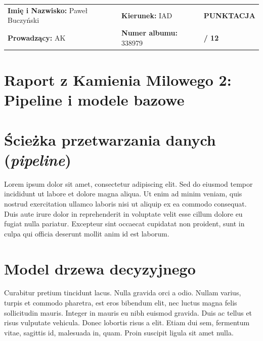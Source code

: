 \documentclass[a4paper,10pt]{article}
\begin{document}
\vspace{-1em}
\noindent
\renewcommand{\arraystretch}{1.3}
\begin{tabularx}{\textwidth}{|>{\hsize=1.2\hsize}X|>{\hsize=0.8\hsize}X|>{\centering\arraybackslash}m{2.5cm}|}
\hline
\rowcolor{tableheader}


\textbf{Imię i Nazwisko:} Paweł Buczyński
& \textbf{Kierunek:} IAD
& \cellcolor{scorebg}\textbf{PUNKTACJA} \\
\rowcolor{tableheader}
\textbf{Prowadzący:}  AK
& \textbf{Numer albumu:} 338979
& \cellcolor{scorebg}\huge{\textbf{ / 12}} \\
\hline
\end{tabularx}
\renewcommand{\arraystretch}{1.0}

\vspace{-1em}


\section*{\color{primaryblue}Raport z Kamienia Milowego 2: Pipeline i modele bazowe}



\section{Ścieżka przetwarzania danych (\textit{pipeline})}

Lorem ipsum dolor sit amet, consectetur adipiscing elit. Sed do eiusmod tempor incididunt ut labore et dolore magna aliqua. Ut enim ad minim veniam, quis nostrud exercitation ullamco laboris nisi ut aliquip ex ea commodo consequat. Duis aute irure dolor in reprehenderit in voluptate velit esse cillum dolore eu fugiat nulla pariatur. Excepteur sint occaecat cupidatat non proident, sunt in culpa qui officia deserunt mollit anim id est laborum.

\section{Model drzewa decyzyjnego}

Curabitur pretium tincidunt lacus. Nulla gravida orci a odio. Nullam varius, turpis et commodo pharetra, est eros bibendum elit, nec luctus magna felis sollicitudin mauris. Integer in mauris eu nibh euismod gravida. Duis ac tellus et risus vulputate vehicula. Donec lobortis risus a elit. Etiam dui sem, fermentum vitae, sagittis id, malesuada in, quam. Proin suscipit ligula sit amet nulla.
\end{document}
